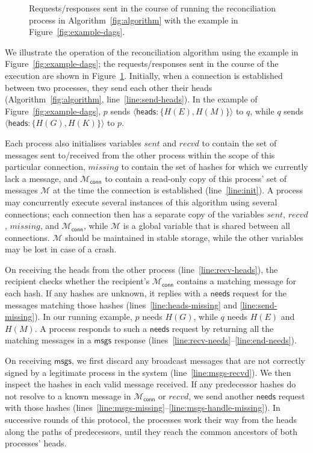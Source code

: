 \documentclass[a4paper,anonymous,USenglish]{lipics-v2019}
\begin{document}
\begin{figure}
    
    \caption{Requests/responses sent in the course of running the reconciliation process in Algorithm~\ref{fig:algorithm} with the example in Figure~\ref{fig:example-dags}.}
    \label{fig:messages}
\end{figure}

We illustrate the operation of the reconciliation algorithm using the example in Figure~\ref{fig:example-dags}; the requests/responses sent in the course of the execution are shown in Figure~\ref{fig:messages}.
Initially, when a connection is established between two processes, they send each other their heads (Algorithm~\ref{fig:algorithm}, line~\ref{line:send-heads}).
In the example of Figure~\ref{fig:example-dags}, $p$ sends $\langle\mathsf{heads}: \{H(E),H(M)\}\rangle$ to $q$, while $q$ sends $\langle\mathsf{heads}: \{H(G),H(K)\}\rangle$ to $p$.

Each process also initialises variables $\mathit{sent}$ and $\mathit{recvd}$ to contain the set of messages sent to/received from the other process within the scope of this particular connection, $\mathit{missing}$ to contain the set of hashes for which we currently lack a message, and $\mathcal{M}_\mathsf{conn}$ to contain a read-only copy of this process' set of messages $\mathcal{M}$ at the time the connection is established (line~\ref{line:init}).
A process may concurrently execute several instances of this algorithm using several connections; each connection then has a separate copy of the variables $\mathit{sent}$, $\mathit{recvd}$, $\mathit{missing}$, and $\mathcal{M}_\mathsf{conn}$, while $\mathcal{M}$ is a global variable that is shared between all connections.
$\mathcal{M}$ should be maintained in stable storage, while the other variables may be lost in case of a crash.

On receiving the heads from the other process (line~\ref{line:recv-heads}), the recipient checks whether the recipient's $\mathcal{M}_\mathsf{conn}$ contains a matching message for each hash.
If any hashes are unknown, it replies with a $\mathsf{needs}$ request for the messages matching those hashes (lines~\ref{line:heads-missing} and \ref{line:send-missing}).
In our running example, $p$ needs $H(G)$, while $q$ needs $H(E)$ and $H(M)$.
A process responds to such a $\mathsf{needs}$ request by returning all the matching messages in a $\mathsf{msgs}$ response (lines~\ref{line:recv-needs}--\ref{line:end-needs}).

On receiving $\mathsf{msgs}$, we first discard any broadcast messages that are not correctly signed by a legitimate process in the system (line~\ref{line:msgs-recvd}).
We then inspect the hashes in each valid message received.
If any predecessor hashes do not resolve to a known message in $\mathcal{M}_\mathsf{conn}$ or $\mathit{recvd}$, we send another $\mathsf{needs}$ request with those hashes (lines~\ref{line:msgs-missing}--\ref{line:msgs-handle-missing}).
In successive rounds of this protocol, the processes work their way from the heads along the paths of predecessors, until they reach the common ancestors of both processes' heads.
\end{document}
